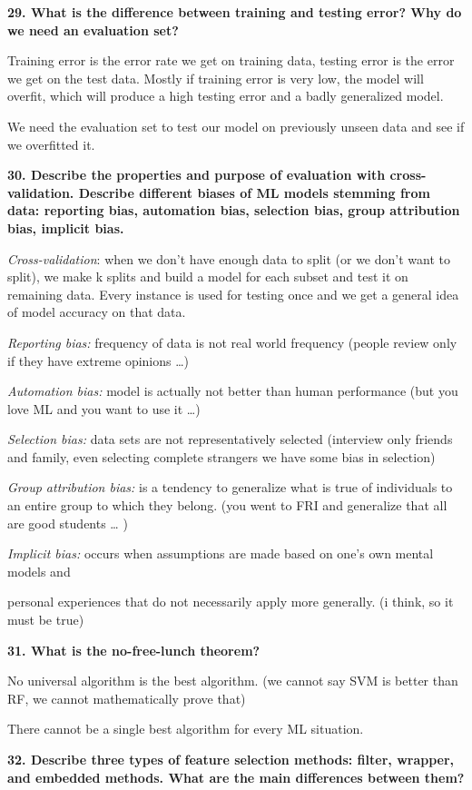 \textbf{29. What is the difference between training and testing error?
Why do we need an evaluation set?}

Training error is the error rate we get on training data, testing error
is the error we get on the test data. Mostly if training error is very
low, the model will overfit, which will produce a high testing error and
a badly generalized model.

We need the evaluation set to test our model on previously unseen data
and see if we overfitted it.

\textbf{30. Describe the properties and purpose of evaluation with
cross-validation. Describe different biases of ML models stemming from
data: reporting bias, automation bias, selection bias, group attribution
bias, implicit bias.}

\textit{Cross-validation}: when we don't have enough data to split
(or we don't want to split), we make k splits and build a model for each
subset and test it on remaining data. Every instance is used for testing
once and we get a general idea of model accuracy on that data.

\textit{Reporting bias:} frequency of data is not real world
frequency (people review only if they have extreme opinions \ldots)

\textit{Automation bias:} model is actually not better than human
performance (but you love ML and you want to use it \ldots)

\textit{Selection bias:} data sets are not representatively selected
(interview only friends and family, even selecting complete strangers we
have some bias in selection)

\textit{Group attribution bias:} is a tendency to generalize what is
true of individuals to an entire group to which they belong. (you went
to FRI and generalize that all are good students \ldots{} )

\textit{Implicit bias:} occurs when assumptions are made based on
one's own mental models and

personal experiences that do not necessarily apply more generally. (i
think, so it must be true)

\textbf{31. What is the no-free-lunch theorem?}

No universal algorithm is the best algorithm. (we cannot say SVM is
better than RF, we cannot mathematically prove that)

There cannot be a single best algorithm for every ML situation.

\textbf{32. Describe three types of feature selection methods: filter,
wrapper, and embedded methods. What are the main differences between
them?}

